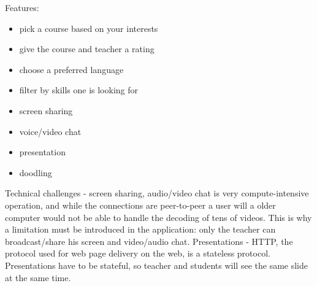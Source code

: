 Features:
\begin{itemize}
    \item pick a course based on your interests
    \item give the course and teacher a rating
    \item choose a preferred language
    \item filter by skills one is looking for
    \item screen sharing
    \item voice/video chat
    \item presentation
    \item doodling
\end{itemize}
Technical challenges - screen sharing, audio/video chat is very compute-intensive operation, and while the connections are peer-to-peer
a user will a older computer would not be able to handle the decoding of tens of videos. This is why a limitation must be introduced in the
application: only the teacher can broadcast/share his screen and video/audio chat. Presentations - HTTP, the protocol used for web page delivery
on the web, is a stateless protocol. Presentations have to be stateful, so teacher and students will see the same slide at the same time.
